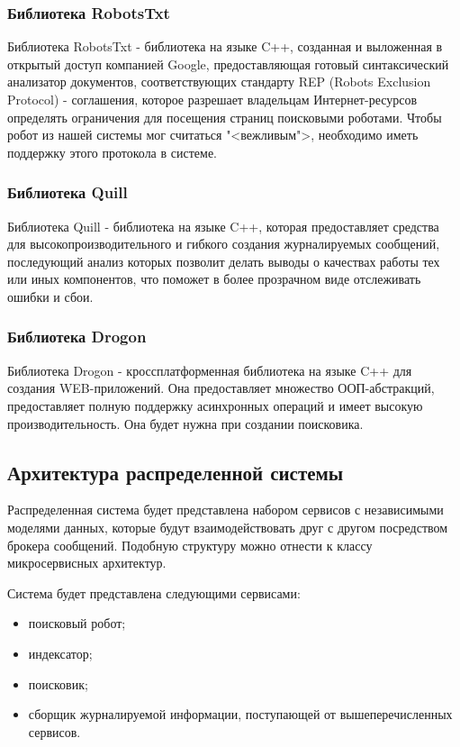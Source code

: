 \subsubsection{Библиотека RobotsTxt}

Библиотека RobotsTxt - библиотека на языке C++, созданная и выложенная в открытый доступ компанией Google, предоставляющая готовый синтаксический анализатор документов, соответствующих стандарту REP (Robots Exclusion Protocol) - соглашения, которое разрешает владельцам Интернет-ресурсов определять ограничения для посещения страниц поисковыми роботами. Чтобы робот из нашей системы мог считаться "<вежливым">, необходимо иметь поддержку этого протокола в системе.

\subsubsection{Библиотека Quill}
Библиотека Quill - библиотека на языке C++, которая предоставляет средства для высокопроизводительного и гибкого создания журналируемых сообщений, последующий анализ которых позволит делать выводы о качествах работы тех или иных компонентов, что поможет в более прозрачном виде отслеживать ошибки и сбои.

\subsubsection{Библиотека Drogon}
Библиотека Drogon - кроссплатформенная библиотека на языке C++ для создания WEB-приложений. Она предоставляет множество ООП-абстракций, предоставляет полную поддержку асинхронных операций и имеет высокую производительность. Она будет нужна при создании поисковика.

\subsection{Архитектура распределенной системы}

Распределенная система будет представлена набором сервисов с независимыми моделями данных, которые будут взаимодействовать друг с другом посредством брокера сообщений. Подобную структуру можно отнести к классу микросервисных архитектур.

Система будет представлена следующими сервисами:
\begin{itemize}
\item поисковый робот;
\item индексатор;
\item поисковик;
\item сборщик журналируемой информации, поступающей от вышеперечисленных сервисов.
\end{itemize}

